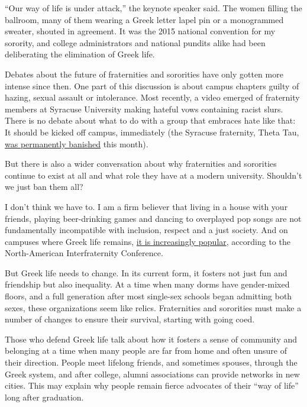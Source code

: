 ``Our way of life is under attack,'' the keynote speaker said. The women
filling the ballroom, many of them wearing a Greek letter lapel pin or a
monogrammed sweater, shouted in agreement. It was the 2015 national
convention for my sorority, and college administrators and national
pundits alike had been deliberating the elimination of Greek life.

Debates about the future of fraternities and sororities have only gotten
more intense since then. One part of this discussion is about campus
chapters guilty of hazing, sexual assault or intolerance. Most recently,
a video emerged of fraternity members at Syracuse University making
hateful vows containing racist slurs. There is no debate about what to
do with a group that embraces hate like that: It should be kicked off
campus, immediately (the Syracuse fraternity, Theta Tau,
\href{http://dailyorange.com/2018/04/theta-tau-chapter-permanently-expelled-su/}{was
permanently banished} this month).

But there is also a wider conversation about why fraternities and
sororities continue to exist at all and what role they have at a modern
university. Shouldn't we just ban them all?

I don't think we have to. I am a firm believer that living in a house
with your friends, playing beer-drinking games and dancing to overplayed
pop songs are not fundamentally incompatible with inclusion, respect and
a just society. And on campuses where Greek life remains,
\href{https://www.washingtonpost.com/news/grade-point/wp/2015/01/20/despite-scandals-and-bad-ink-more-and-more-students-want-to-go-greek/?utm_term=.5d2b669d68ec}{it
is increasingly popular}, according to the North-American
Interfraternity Conference.

But Greek life needs to change. In its current form, it fosters not just
fun and friendship but also inequality. At a time when many dorms have
gender-mixed floors, and a full generation after most single-sex schools
began admitting both sexes, these organizations seem like relics.
Fraternities and sororities must make a number of changes to ensure
their survival, starting with going coed.

Those who defend Greek life talk about how it fosters a sense of
community and belonging at a time when many people are far from home and
often unsure of their direction. People meet lifelong friends, and
sometimes spouses, through the Greek system, and after college, alumni
associations can provide networks in new cities. This may explain why
people remain fierce advocates of their ``way of life'' long after
graduation.

